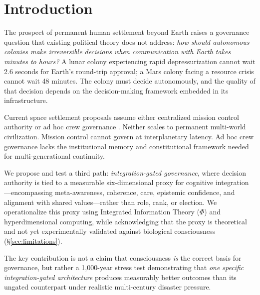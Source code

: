 \documentclass[12pt,a4paper]{article}
\begin{document}

\section{Introduction}

The prospect of permanent human settlement beyond Earth raises a governance question that existing political theory does not address: \emph{how should autonomous colonies make irreversible decisions when communication with Earth takes minutes to hours?} A lunar colony experiencing rapid depressurization cannot wait 2.6 seconds for Earth's round-trip approval; a Mars colony facing a resource crisis cannot wait 48 minutes. The colony must decide autonomously, and the quality of that decision depends on the decision-making framework embedded in its infrastructure.

Current space settlement proposals assume either centralized mission control authority \citep{zubrin1996case} or ad hoc crew governance \citep{cockell2006space}. Neither scales to permanent multi-world civilization. Mission control cannot govern at interplanetary latency. Ad hoc crew governance lacks the institutional memory and constitutional framework needed for multi-generational continuity.

We propose and test a third path: \emph{integration-gated governance}, where decision authority is tied to a measurable six-dimensional proxy for cognitive integration---encompassing meta-awareness, coherence, care, epistemic confidence, and alignment with shared values---rather than role, rank, or election. We operationalize this proxy using Integrated Information Theory ($\Phi$) \citep{tononi2004information} and hyperdimensional computing, while acknowledging that the proxy is theoretical and not yet experimentally validated against biological consciousness (\S\ref{sec:limitations}).

The key contribution is not a claim that consciousness \emph{is} the correct basis for governance, but rather a 1,000-year stress test demonstrating that \emph{one specific integration-gated architecture} produces measurably better outcomes than its ungated counterpart under realistic multi-century disaster pressure.
\end{document}
